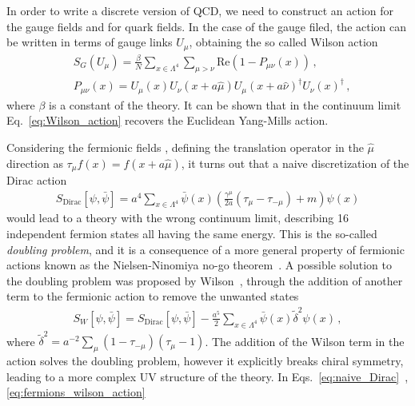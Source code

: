 %
In order to write a discrete version of QCD, we need to construct an action for the gauge fields and for quark fields.
In the case of the gauge filed, the action can be written in terms of gauge links $U_{\mu}$, obtaining the so called Wilson action
\begin{align}
    \label{eq:Wilson_action}
    &S_G\left(U_{\mu}\right) = 
    \frac{\beta}{N}\sum_{x\in \Lambda^4}\sum_{\mu>\nu}\text{Re}\left(1-P_{\mu\nu}\left(x\right)\right)\,, \\
    &P_{\mu\nu}\left(x\right) = U_{\mu}\left(x\right)U_{\nu}\left(x+a\hat{\mu}\right)
    U_{\mu}\left(x+a\hat{\nu}\right)^{\dagger}U_{\nu}\left(x\right)^{\dagger}\,,
\end{align}
where $\beta$ is a constant of the theory. It can be shown that in the continuum limit Eq.~\ref{eq:Wilson_action}
recovers the Euclidean Yang-Mills action.

%
Considering the fermionic fields
, defining the translation operator in the $\hat{\mu}$ direction as 
$\tau_{\mu}f\left(x\right) = f\left(x+a\hat{\mu}\right)$, 
it turns out that a naive discretization of the Dirac action
\begin{align}
    \label{eq:naive_Dirac}
    S_{\text{Dirac}}\left[\psi,\bar{\psi}\right] = 
    a^4\sum_{x\in\Lambda^4}\bar{\psi}\left(x\right)\left(\frac{\gamma^{\mu}}{2a}\left(\tau_{\mu}-\tau_{-\mu}\right) + m\right) \psi\left(x\right)
\end{align}
would lead to a theory with the wrong continuum limit, describing 16 independent fermion states all having the same energy.
This is the so-called \textit{doubling problem}, and it is a consequence of a more general property of 
fermionic actions known as the Nielsen-Ninomiya no-go theorem~\cite{Nielsen:1981hk}.
A possible solution to the doubling problem was proposed by Wilson~\cite{PhysRevD.10.2445}, through the addition of another term to the fermionic action
to remove the unwanted states
\begin{align}
    \label{eq:fermions_wilson_action}
    S_W\left[\psi,\bar{\psi}\right] = S_{\text{Dirac}}\left[\psi,\bar{\psi}\right] 
    - \frac{a^5}{2}\sum_{x\in\Lambda^4}\bar{\psi}\left(x\right)\tilde{\delta}^2 \psi\left(x\right)\,,
\end{align}
where $\tilde{\delta}^2 = a^{-2}\sum_{\mu}\left(1-\tau_{-\mu}\right)\left(\tau_{\mu}-1\right)$.
The addition of the Wilson term in the action solves the doubling problem, however it explicitly breaks
chiral symmetry, leading to a more complex UV structure of the theory.
In Eqs.~\ref{eq:naive_Dirac}~,\ref{eq:fermions_wilson_action}

